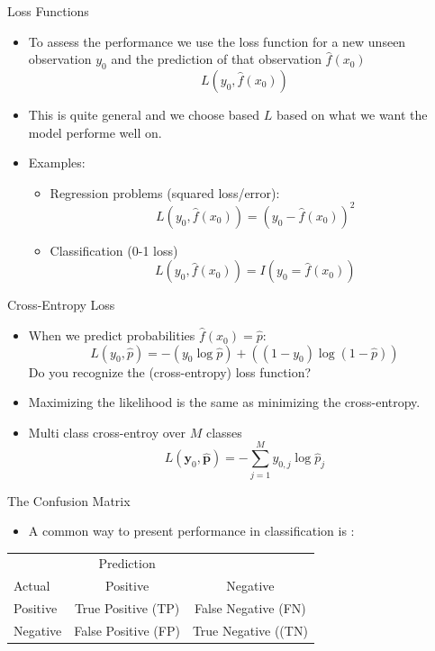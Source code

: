 \documentclass[10pt]{beamer}
\begin{document}
\begin{frame}{Loss Functions}



\begin{itemize}

\item To assess the performance we use the loss function for a new unseen observation $y_0$ and the prediction of that observation $\hat{f}(x_0)$
\[
L(y_0,\hat{f}(x_0))
\]
\pause
\item This is quite general and we choose based $L$ based on what we want the model performe well on.\pause
\item Examples:
\begin{itemize}
\item Regression problems (squared loss/error):
\[
    L(y_0,\hat{f}(x_0)) = (y_0 - \hat{f}(x_0))^2
\]
\pause
\item Classification (0-1 loss)
\[
    L(y_0,\hat{f}(x_0)) = I(y_0 = \hat{f}(x_0))
\]
\end{itemize}


\end{itemize}

\end{frame}


\begin{frame}{Cross-Entropy Loss}

\begin{itemize}
\item When we predict probabilities $\hat{f}(x_0)=\hat{p}$:
\[
L(y_0, \hat{p}) = - (y_0 \log{\hat{p}}) + ((1 - y_0) \log{(1- \hat{p})})
\]
 Do you recognize the (cross-entropy) loss function?
\pause
\item Maximizing the likelihood is the same as minimizing the cross-entropy. \pause
\item Multi class cross-entroy over $M$ classes
\[
L(\mathbf{y}_0, \hat{\mathbf{p}}) = - \sum^M_{j=1} y_{0,j} \log{\hat{p}_j}
\]
\end{itemize}

\end{frame}


\begin{frame}{The Confusion Matrix}

\begin{itemize}
\item A common way to present performance in classification is :
\end{itemize}
\centering
\begin{tabular}{lcc}
  & Prediction &  \\
  Actual & Positive & Negative \\
  Positive & True Positive (TP) & False Negative (FN) \\
  Negative & False Positive (FP) & True Negative ((TN)
\end{tabular}


\end{frame}
\end{document}
